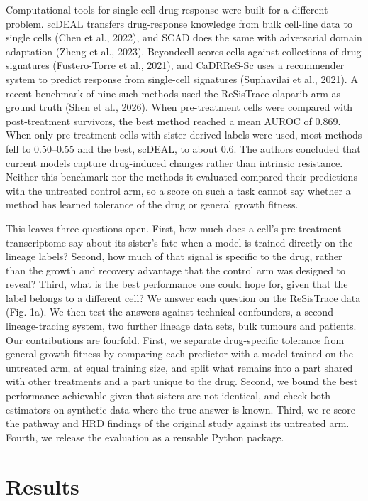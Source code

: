 \documentclass[11pt,a4paper]{article}
\begin{document}
Computational tools for single-cell drug response were built for a different problem. scDEAL transfers drug-response knowledge from bulk cell-line data to single cells (Chen et al., 2022), and SCAD does the same with adversarial domain adaptation (Zheng et al., 2023). Beyondcell scores cells against collections of drug signatures (Fustero-Torre et al., 2021), and CaDRReS-Sc uses a recommender system to predict response from single-cell signatures (Suphavilai et al., 2021). A recent benchmark of nine such methods used the ReSisTrace olaparib arm as ground truth (Shen et al., 2026). When pre-treatment cells were compared with post-treatment survivors, the best method reached a mean AUROC of 0.869. When only pre-treatment cells with sister-derived labels were used, most methods fell to 0.50--0.55 and the best, scDEAL, to about 0.6. The authors concluded that current models capture drug-induced changes rather than intrinsic resistance. Neither this benchmark nor the methods it evaluated compared their predictions with the untreated control arm, so a score on such a task cannot say whether a method has learned tolerance of the drug or general growth fitness.

This leaves three questions open. First, how much does a cell's pre-treatment transcriptome say about its sister's fate when a model is trained directly on the lineage labels? Second, how much of that signal is specific to the drug, rather than the growth and recovery advantage that the control arm was designed to reveal? Third, what is the best performance one could hope for, given that the label belongs to a different cell? We answer each question on the ReSisTrace data (Fig. 1a). We then test the answers against technical confounders, a second lineage-tracing system, two further lineage data sets, bulk tumours and patients. Our contributions are fourfold. First, we separate drug-specific tolerance from general growth fitness by comparing each predictor with a model trained on the untreated arm, at equal training size, and split what remains into a part shared with other treatments and a part unique to the drug. Second, we bound the best performance achievable given that sisters are not identical, and check both estimators on synthetic data where the true answer is known. Third, we re-score the pathway and HRD findings of the original study against its untreated arm. Fourth, we release the evaluation as a reusable Python package.

\section*{Results}
\end{document}
